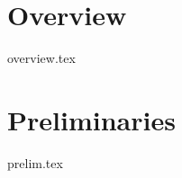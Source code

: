 \section{Overview}\label{sec:intro:overview}
    {{overview.tex}}






    
    



\section{Preliminaries}\label{sec:intro:prelim}
    {{prelim.tex}}




